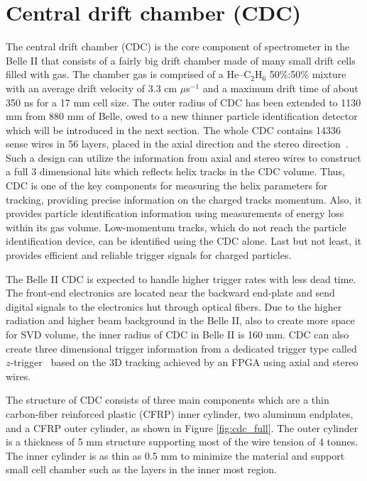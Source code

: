 \section{Central drift chamber (CDC)}
The central drift chamber (CDC) is the core component of spectrometer in the Belle II that consists of a fairly big drift chamber made of many small drift cells filled with gas. The chamber
gas is comprised of a He–C$_2$H$_6$ 50\%:50\% mixture with an average drift velocity of 3.3 cm $\mu$s$^{-1}$ and a
maximum drift time of about 350 ns for a 17 mm cell size.
The outer radius of CDC has been extended to 1130 mm from 880 mm of Belle, owed to a new thinner particle identification detector which will be introduced in the next section. The whole CDC contains 14336 sense wires in 56 layers, placed in the axial direction and the stereo direction~\cite{b2book}\cite{Abe:2010gxa}. Such a design can utilize the information from axial and stereo wires to construct a full 3 dimensional hits which reflects helix tracks in the CDC volume. Thus, CDC is one of the key components for measuring the helix parameters for tracking, providing precise information on the charged tracks momentum. Also, it provides particle identification information using measurements of energy loss within its gas volume. Low-momentum tracks, which do not reach the particle identification device, can be identified using the CDC alone. Last but not least, it provides efficient and reliable trigger signals for charged particles.

The Belle II CDC is expected to handle higher trigger rates with less dead time. The front-end electronics are located near the backward end-plate and send digital signals to the
electronics hut through optical fibers. Due to the higher radiation and higher beam background in the Belle II, also to create more space for SVD volume, the inner radius of CDC in Belle II is 160 mm. CDC can also create three dimensional trigger information from a dedicated trigger type called $z$-trigger~\cite{Abe:2010gxa} based on the 3D tracking achieved by an FPGA using axial and stereo wires.

The structure of CDC consists of three main components which are a thin carbon-fiber reinforced
plastic (CFRP) inner cylinder, two aluminum endplates, and a CFRP outer cylinder, as shown in Figure \ref{fig:cdc_full}. The outer cylinder is a thickness of 5 mm structure supporting most of the wire tension of 4 tonnes. The inner cylinder is as thin as 0.5 mm to minimize the material and support small cell chamber such as the layers in the inner most region. 

